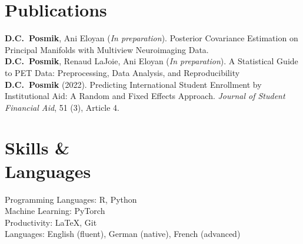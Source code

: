 \documentclass[margin,line]{res}
\begin{document}
\begin{resume}
\section{\sc Publications}

\textbf{D.C.\ Posmik}, Ani Eloyan (\emph{In preparation}). {Posterior Covariance Estimation on Principal Manifolds with Multiview Neuroimaging Data}. \\[1mm]
\textbf{D.C.\ Posmik}, Renaud LaJoie, Ani Eloyan (\emph{In preparation}). {A Statistical Guide to PET Data: Preprocessing, Data Analysis, and Reproducibility} \\[1mm]
\textbf{D.C.\ Posmik} (2022). {Predicting International Student Enrollment by Institutional Aid: A Random and Fixed Effects Approach}. \textit{Journal of Student Financial Aid}, 51 (3), Article 4.

\section{\sc Skills \& \\ Languages}
Programming Languages: R, Python \\
Machine Learning: PyTorch \\
Productivity: \LaTeX, Git \\
Languages: English (fluent), German (native), French (advanced)

\end{resume}
\end{document}
